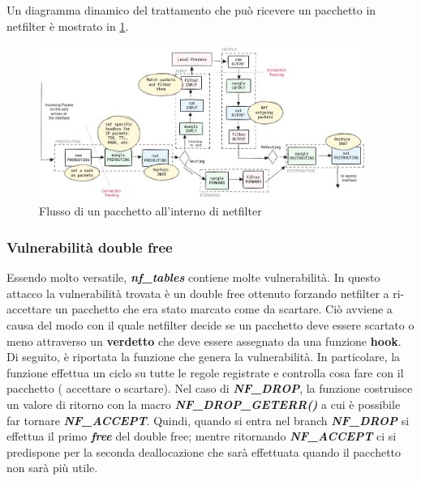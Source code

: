 \documentclass{article}
\begin{document}
Un diagramma dinamico del trattamento che può ricevere un pacchetto in netfilter è mostrato 
in \cref{fig:nf_flow}.

\begin{figure}[h]
  \begin{center}
    \includegraphics[width=0.95\textwidth]{figures/ch1/Diagrama_linux_netfilter_iptables.png}
  \end{center}
  \caption{Flusso di un pacchetto all'interno di netfilter}\label{fig:nf_flow}
\end{figure}

\subsubsection{Vulnerabilità double free} Essendo molto versatile, \textbf{\textit{nf\_tables}} 
contiene molte vulnerabilità. In questo attacco la vulnerabilità trovata è un double free 
ottenuto forzando netfilter a ri-accettare un pacchetto che era stato marcato come da scartare. 
Ciò avviene a causa del modo con il quale netfilter decide se un pacchetto deve essere scartato o 
meno attraverso un \textbf{verdetto} che deve essere assegnato da una funzione \textbf{hook}. 
Di seguito, è riportata la funzione che genera la vulnerabilità. In particolare, la funzione 
effettua un ciclo su tutte le regole registrate e controlla cosa fare con il pacchetto (
accettare o scartare). Nel caso di \textbf{\textit{NF\_DROP}}, la funzione costruisce un 
valore di ritorno con la macro \textbf{\textit{NF\_DROP\_GETERR()}} a cui è possibile far 
tornare \textbf{\textit{NF\_ACCEPT}}. Quindi, quando si entra nel branch \textbf{\textit{NF\_DROP}}
si effettua il primo \textbf{\textit{free}} del double free; mentre ritornando \textbf{\textit{NF\_ACCEPT}}
ci si predispone per la seconda deallocazione che sarà effettuata quando il pacchetto non 
sarà più utile.
\end{document}
